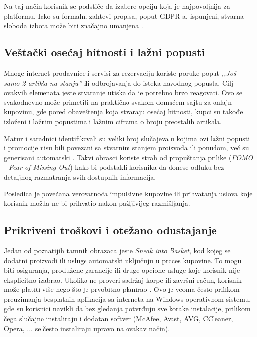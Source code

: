 \documentclass[12pt,a4paper]{article}
\begin{document}
Na taj način korisnik se podstiče da izabere opciju koja je najpovoljnija za platformu. Iako su formalni zahtevi propisa, poput GDPR-a, ispunjeni, stvarna sloboda izbora može biti značajno umanjena \cite{mathur2019dark}.

\subsection{Veštački osećaj hitnosti i lažni popusti}

Mnoge internet prodavnice i servisi za rezervaciju koriste poruke poput \emph{,,Još samo 2 artikla na stanju''} ili odbrojavanja do isteka navodnog popusta. Cilj ovakvih elemenata jeste stvaranje utiska da je potrebno brzo reagovati. Ovo se svakodnevno može primetiti na praktično svakom domaćem sajtu za onlajn kupovinu, gde pored obaveštenja koja stvaraju osećaj hitnosti, kupci su takođe izloženi i lažnim popustima i lažnim ciframa o broju preostalih artikala.

Matur i saradnici identifikovali su veliki broj slučajeva u kojima ovi lažni popusti i promocije nisu bili povezani sa stvarnim stanjem proizvoda ili ponudom, već su generisani automatski \cite{mathur2019dark}. Takvi obrasci koriste strah od propuštanja prilike (\emph{FOMO - Fear of Missing Out}) kako bi podstakli korisnika da donese odluku bez detaljnog razmatranja svih dostupnih informacija.

Posledica je povećana verovatnoća impulsivne kupovine ili prihvatanja uslova koje korisnik možda ne bi prihvatio nakon pažljivijeg razmišljanja.

\subsection{Prikriveni troškovi i otežano odustajanje}

Jedan od poznatijih tamnih obrazaca jeste \emph{Sneak into Basket}, kod kojeg se dodatni proizvodi ili usluge automatski uključuju u proces kupovine. To mogu biti osiguranja, produžene garancije ili druge opcione usluge koje korisnik nije eksplicitno izabrao. Ukoliko ne proveri sadržaj korpe ili završni račun, korisnik može platiti više nego što je prvobitno planirao \cite{mathur2019dark}. Ovo je veoma često prilikom preuzimanja besplatnih aplikacija sa interneta na Windows operativnom sistemu, gde su korisnici navikli da bez gledanja potvrđuju sve korake instalacije, prilikom čega slučajno instaliraju i dodatan softver (McAfee, Avast, AVG, CCleaner, Opera, ... se često instaliraju upravo na ovakav način).
\end{document}
